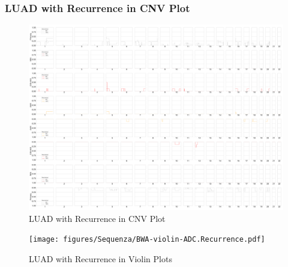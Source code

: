 \documentclass{beamer}
\begin{document}
    \begin{frame}[allowframebreaks]
        \frametitle{LUAD with Recurrence in CNV Plot}

        \begin{figure}
            \includegraphics[width=0.6 \linewidth]{figures/Sequenza/BWA-simple-ADC.Recurrence.pdf}
            \caption{LUAD with Recurrence in CNV Plot}
        \end{figure}

        \begin{figure}
            \texttt{[image: figures/Sequenza/BWA-violin-ADC.Recurrence.pdf]}
            \caption{LUAD with Recurrence in Violin Plots}
        \end{figure}
    \end{frame}
\end{document}
